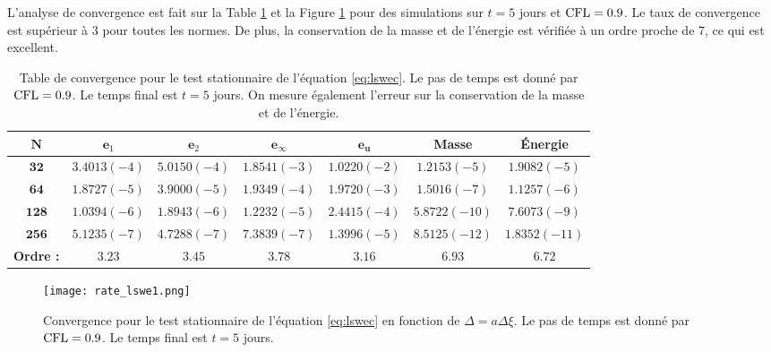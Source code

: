 L'analyse de convergence est fait sur la Table \ref{tab:rate_lswe1} et la Figure \ref{fig:rate_lswe1} pour des simulations sur $t=5$ jours et $\text{CFL}=0.9$. Le taux de convergence est supérieur à 3 pour toutes les normes. De plus, la conservation de la masse et de l'énergie est vérifiée à un ordre proche de 7, ce qui est excellent.

\begin{table}[htbp]
\begin{center}
\begin{tabular}{|c||c|c|c|c||c|c|}
\hline 
$\mathbf{N}$ & $\mathbf{e}_1$ & $\mathbf{e}_2$ & $\mathbf{e}_{\infty}$ & $\mathbf{e}_{\mathbf{u}}$ & \textbf{Masse} & \textbf{Énergie} \\ 
\hline 
\hline 
$\mathbf{32}$ & $3.4013(-4)$ & $5.0150(-4)$ & $1.8541(-3)$ & $1.0220(-2)$ & $1.2153(-5)$ & $1.9082(-5)$ \\ 

$\mathbf{64}$ & $1.8727(-5)$ & $3.9000(-5)$ & $1.9349(-4)$ & $1.9720(-3)$ & $1.5016(-7)$ & $1.1257(-6)$ \\ 

$\mathbf{128}$& $1.0394(-6)$ & $1.8943(-6)$ & $1.2232(-5)$ & $2.4415(-4)$ & $5.8722(-10)$ & $7.6073(-9)$ \\ 

$\mathbf{256}$& $5.1235(-7)$ & $4.7288(-7)$ & $7.3839(-7)$ & $1.3996(-5)$ & $8.5125(-12)$ & $1.8352(-11)$ \\ 

\hline
\textbf{Ordre :} & $3.23$ & $3.45$ & $3.78$ & $3.16$ & $6.93$ & $6.72$ \\ 
\hline
\end{tabular} 
\end{center}
\caption{Table de convergence pour le test stationnaire de l'équation \eqref{eq:lswec}. Le pas de temps est donné par $\text{CFL}=0.9$. Le temps final est $t=5$ jours. On mesure également l'erreur sur la conservation de la masse et de l'énergie.}
\label{tab:rate_lswe1}
\end{table}

\begin{figure}[htbp]
\begin{center}
\texttt{[image: rate\_lswe1.png]}
\end{center}
\caption{Convergence pour le test stationnaire de l'équation \eqref{eq:lswec} en fonction de $\Delta = a \Delta \xi$. Le pas de temps est donné par $\text{CFL}=0.9$. Le temps final est $t=5$ jours.}
\label{fig:rate_lswe1}
\end{figure}











